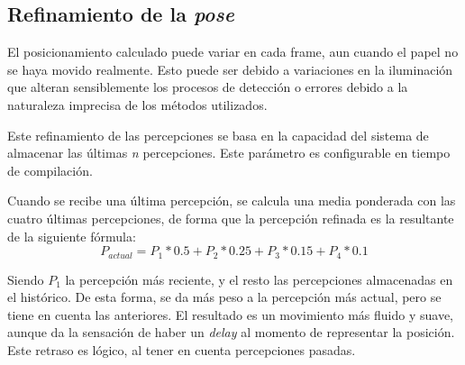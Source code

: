 \subsection{Refinamiento de la \emph{pose}}
El posicionamiento calculado puede variar en cada frame, aun cuando el papel no se haya movido
realmente. Esto puede ser debido a variaciones en la iluminación que alteran sensiblemente los
procesos de detección o errores debido a la naturaleza imprecisa de los métodos utilizados.

Este refinamiento de las percepciones se basa en la capacidad del sistema de almacenar las últimas
\textit{n} percepciones. Este parámetro es configurable en tiempo de compilación.


Cuando se recibe una última percepción, se calcula una media ponderada con las cuatro últimas
percepciones, de forma que la percepción refinada es la resultante de la siguiente fórmula:
\begin{equation}
P_{actual} = P_1*0.5 + P_2*0.25 + P_3*0.15 + P_4*0.1
\end{equation}

Siendo $P_1$ la percepción más reciente, y el resto las percepciones almacenadas en el histórico. De esta forma, se da más peso a la percepción más actual, pero se tiene en cuenta las anteriores. El resultado es un movimiento más fluido y suave, aunque da la sensación de haber un \textit{delay} al momento de representar la posición. Este retraso es lógico, al tener en cuenta percepciones pasadas.



